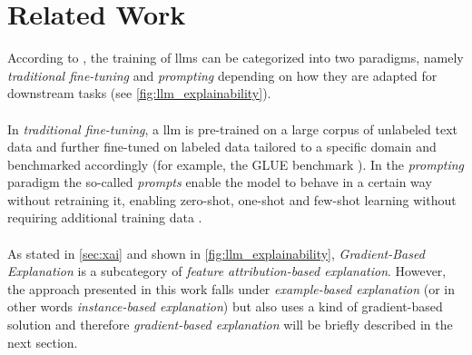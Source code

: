 \chapter{Related Work}
According to \cite{DBLP:journals/tist/ZhaoCYLDCWYD24}, the training of \acrshort{llm}s can be categorized into two paradigms, namely \textit{traditional fine-tuning} and \textit{prompting} depending on how they are adapted for downstream tasks (see \autoref{fig:llm_explainability}).
\\\\
In \textit{traditional fine-tuning}, a \acrlong{llm} is pre-trained on a large corpus of unlabeled text data and further fine-tuned on labeled data tailored to a specific domain and benchmarked accordingly (for example, the GLUE benchmark \cite{DBLP:conf/iclr/WangSMHLB19}). In the \textit{prompting} paradigm the so-called \textit{prompts} enable the model to behave in a certain way without retraining it, enabling zero-shot, one-shot and few-shot learning without requiring additional training data \cite{DBLP:conf/nips/BrownMRSKDNSSAA20}.
\\\\
As stated in \autoref{sec:xai} and shown in \autoref{fig:llm_explainability}, \textit{Gradient-Based Explanation} is a subcategory of \textit{feature attribution-based explanation}. However, the approach presented in this work falls under \textit{example-based explanation} (or in other words \textit{instance-based explanation}) but also uses a kind of gradient-based solution and therefore \textit{gradient-based explanation} will be briefly described in the next section.

